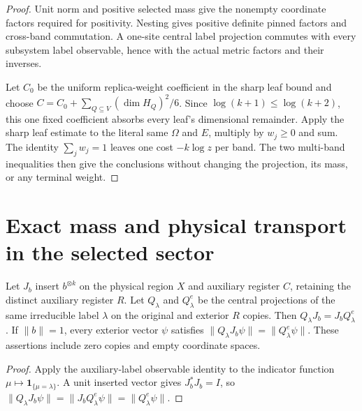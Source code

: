 \begin{proof}
    \leanok
    Unit norm and positive selected mass give the nonempty coordinate
    factors required for positivity. Nesting gives positive definite
    pinned factors and cross-band commutation. A one-site central label
    projection commutes with every subsystem label observable, hence with
    the actual metric factors and their inverses.

    Let $C_0$ be the uniform replica-weight coefficient in the sharp
    leaf bound and choose
    $C=C_0+\sum_{Q\subseteq V}(\dim H_Q)^2/6$.
    Since $\log(k+1)\leq\log(k+2)$, this one fixed coefficient absorbs
    every leaf's dimensional remainder. Apply the sharp leaf estimate
    to the literal same $\Omega$ and $E$, multiply by $w_j\geq0$ and
    sum. The identity $\sum_jw_j=1$ leaves one cost $-k\log z$ per band.
    The two multi-band inequalities then give the conclusions without
    changing the projection, its mass, or any terminal weight.
\end{proof}

\section{Exact mass and physical transport in the selected sector}
\label{sec:selected_bell_sector_transport}

\begin{theorem}
    \label{thm:selected_bell_auxiliary_intertwining}
    \leanok
    Let $J_b$ insert $b^{\otimes k}$ on the physical region $X$ and
    auxiliary register $C$, retaining the distinct auxiliary register $R$.
    Let $Q_\lambda$ and $Q^e_\lambda$ be the central projections of the
    same irreducible label $\lambda$ on the original and exterior $R$
    copies. Then $Q_\lambda J_b=J_bQ^e_\lambda$.
    If $\|b\|=1$, every exterior vector $\psi$ satisfies
    $\|Q_\lambda J_b\psi\|=\|Q^e_\lambda\psi\|$.
    These assertions include zero copies and empty coordinate spaces.
\end{theorem}
\begin{proof}
    \leanok
    Apply the auxiliary-label observable identity to the indicator
    function $\mu\mapsto\mathbf1_{\{\mu=\lambda\}}$.
    A unit inserted vector gives $J_b^*J_b=I$, so
    $\|Q_\lambda J_b\psi\|=\|J_bQ^e_\lambda\psi\|
      =\|Q^e_\lambda\psi\|$.
\end{proof}

